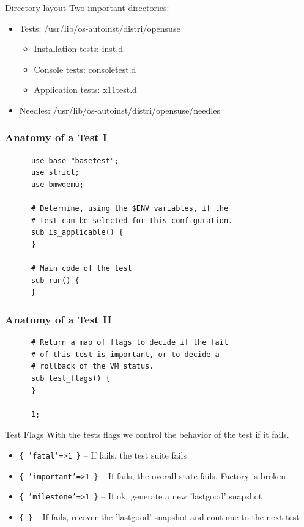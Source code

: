 \documentclass{beamer}
\begin{document}
%
%
\begin{frame}{Directory layout}
  Two important directories:
  \begin{itemize}
  \item Tests: /usr/lib/os-autoinst/distri/opensuse
    \begin{itemize}
    \item Installation tests: inst.d
    \item Console tests: consoletest.d
    \item Application tests: x11test.d
    \end{itemize}
  \item Needles: /usr/lib/os-autoinst/distri/opensuse/needles
  \end{itemize}
\end{frame}

%
%
\begin{frame}[fragile]
  \frametitle{Anatomy of a Test I}
    \lstset{style=myperl}
    \begin{lstlisting}
      use base "basetest";
      use strict;
      use bmwqemu;

      # Determine, using the $ENV variables, if the
      # test can be selected for this configuration.
      sub is_applicable() {
      }

      # Main code of the test
      sub run() {
      }
    \end{lstlisting}
\end{frame}

\begin{frame}[fragile]
  \frametitle{Anatomy of a Test II}
    \lstset{style=myperl}
    \begin{lstlisting}
      # Return a map of flags to decide if the fail
      # of this test is important, or to decide a
      # rollback of the VM status.
      sub test_flags() {
      }

      1;
    \end{lstlisting}
\end{frame}

\begin{frame}{Test Flags}
  With the tests flags we control the behavior of the test if it fails.
  \begin{itemize}
  \item \texttt{\{ 'fatal'=>1 \}} -- If fails, the test suite fails
  \item \texttt{\{ 'important'=>1 \}} -- If fails, the overall state fails. Factory is broken
  \item \texttt{\{ 'milestone'=>1 \}} -- If ok, generate a new 'lastgood' snapshot
  \item \texttt{\{ \}} -- If fails, recover the 'lastgood' snapshot and continue to the next test
  \end{itemize}
\end{frame}
\end{document}

